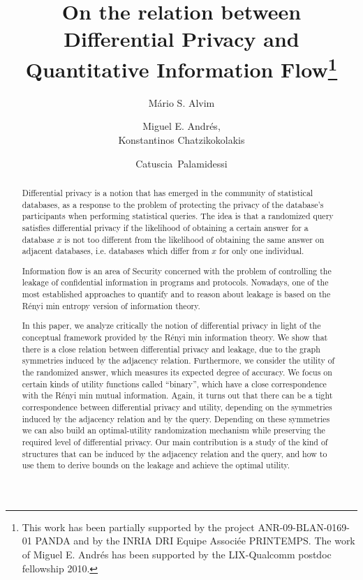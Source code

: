 \documentclass{llncs}
\begin{document}
\title{On the relation between Differential Privacy and Quantitative Information Flow\thanks{This work has been partially supported by the project ANR-09-BLAN-0169-01  PANDA  and by  the INRIA DRI  Equipe Associ\'ee PRINTEMPS. The work of Miguel E. Andr\'es has been supported by the LIX-Qualcomm  postdoc fellowship 2010.}
}
\author{ M\'ario S. Alvim  \and Miguel E. Andr\'es,  \\ Konstantinos Chatzikokolakis  \and Catuscia~Palamidessi }

\maketitle

\begin{abstract}

Differential privacy is a notion that has emerged in the community of statistical databases, as a response to the problem of protecting the privacy of the database's participants  when performing statistical queries. 
The idea is that a randomized query satisfies differential privacy if the likelihood of obtaining a certain answer for a database $x$ is not too different from the likelihood of obtaining the same answer on adjacent databases, i.e. databases  which differ from $x$ for only one individual. 

Information flow is an area of Security concerned with the problem of controlling the leakage of confidential information in programs and protocols. 
Nowadays, one of the most established approaches  to quantify and  to reason about leakage is based on the R\'enyi min entropy version of  information theory.  

In this paper, we analyze critically the notion of differential privacy in light of the conceptual framework provided by  the R\'enyi min  information theory.
We show that  there is a close relation between differential privacy and leakage, due to the graph symmetries induced by the adjacency relation. 
Furthermore, we consider  the utility of the randomized answer, which measures its expected  degree of accuracy. We  focus on certain kinds of utility functions called ``binary'', which have a 
close correspondence with the R\'enyi min mutual information. Again, it turns out that there can be a tight correspondence between differential privacy and utility, depending 
on the  symmetries induced by the adjacency relation and by the query. Depending on these symmetries we can also build an optimal-utility randomization mechanism while preserving the required level of differential privacy. Our main contribution is a study of the kind of structures that can be induced  by the adjacency relation and the query, and how to use them to derive bounds on the leakage and achieve the optimal utility. 
\end{abstract}
\end{document}
